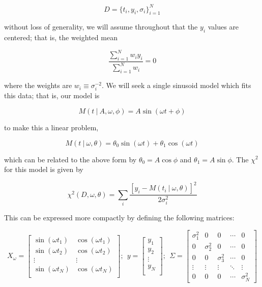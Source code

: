 \documentclass[12pt,preprint]{aastex}
\begin{document}
\begin{equation}
  D = \{t_i,y_i,\sigma_i\}_{i=1}^N
\end{equation}

without loss of generality, we will assume throughout that the $y_i$ values are centered; that is, the weighted mean

\begin{equation}
  \label{eq:centered-data}
  \frac{\sum_{i=1}^N w_i y_i}{\sum_{i=1}^N w_i} = 0
\end{equation}

where the weights are $w_i \equiv \sigma_i^{-2}$. We will seek a single sinusoid model which fits this data; that is, our model is

\begin{equation}
M(t~|~A,\omega,\phi) = A \sin(\omega t + \phi)
\end{equation}

to make this a linear problem,

\begin{equation}
M(t~|~\omega,\theta) = \theta_0 \sin(\omega t) + \theta_1\cos(\omega t)
\end{equation}

which can be related to the above form by $\theta_0 = A\cos\phi$ and $\theta_1 = A\sin\phi$.
The $\chi^2$ for this model is given by

\begin{equation}
\chi^2(D, \omega, \theta) = \sum_i\frac{[y_i - M(t_i~|~\omega,\theta)]^2}{2\sigma_i^2}
\end{equation}

This can be expressed more compactly by defining the following matrices:

\begin{equation}
X_\omega = \left[
\begin{array}{cc}
\sin(\omega t_1) & \cos(\omega t_1)\\
\sin(\omega t_2) & \cos(\omega t_2)\\
\vdots & \vdots \\
\sin(\omega t_N) & \cos(\omega t_N)\\
\end{array}
\right];~~
y = \left[
\begin{array}{c}
y_1 \\
y_2\\
\vdots \\
y_N\\
\end{array}
\right];~~
\Sigma = \left[
\begin{array}{ccccc}
\sigma_1^2 & 0 & 0 & \cdots & 0\\
0 & \sigma_2^2 & 0 & \cdots & 0\\
0 & 0 & \sigma_3^2 & \cdots & 0\\
\vdots & \vdots & \vdots & \ddots & \vdots\\
0 & 0 & 0 & \cdots & \sigma_N^2
\end{array}
\right]
\end{equation}
\end{document}
